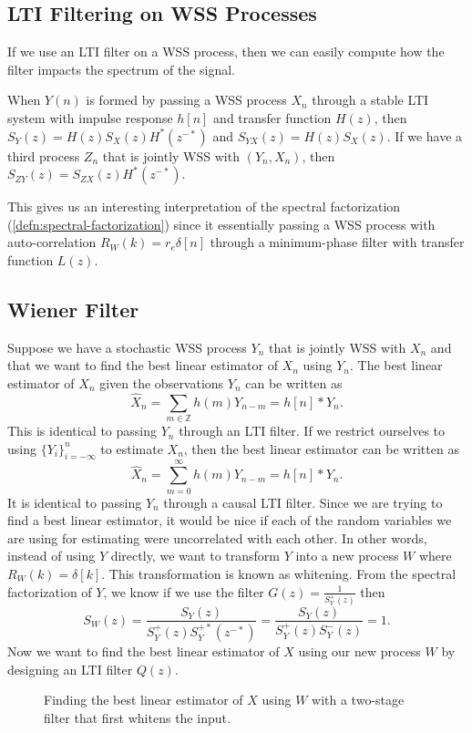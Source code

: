 \subsection{LTI Filtering on WSS Processes}
If we use an LTI filter on a WSS process, then we can easily compute how the filter impacts the spectrum of the signal.
\begin{theorem}
	When $Y(n)$ is formed by passing a WSS process $X_n$ through a stable LTI system with impulse response $h[n]$ and transfer function $H(z)$, then $S_Y(z) = H(z)S_X(z)H^*(z^{-*})$ and $S_{YX}(z) = H(z)S_X(z)$.
	If we have a third process $Z_n$ that is jointly WSS with $(Y_n, X_n)$, then $S_{ZY}(z) = S_{ZX}(z)H^*(z^{-*})$.
	\label{thm:lti-process}
\end{theorem}
This gives us an interesting interpretation of the spectral factorization (\cref{defn:spectral-factorization}) since it essentially passing a WSS process with auto-correlation $R_W(k) = r_e\delta[n]$ through a minimum-phase filter with transfer function $L(z)$.
\subsection{Wiener Filter}
Suppose we have a stochastic WSS process $Y_n$ that is jointly WSS with $X_n$ and that we want to find the best linear estimator of $X_n$ using $Y_n$.
The best linear estimator of $X_n$ given the observations $Y_n$ can be written as \[
	\hat{X}_n = \sum_{m\in\mathbb{Z}}h(m)Y_{n-m} = h[n] * Y_n.
\]
This is identical to passing $Y_n$ through an LTI filter.
If we restrict ourselves to using $\{Y_i\}_{i=-\infty}^{n}$ to estimate $X_n$, then the best linear estimator can be written as \[
	\hat{X}_n = \sum_{m=0}^\infty h(m)Y_{n-m} = h[n] * Y_n.
\]
It is identical to passing $Y_n$ through a causal LTI filter.
Since we are trying to find a best linear estimator, it would be nice if each of the random variables we are using for estimating were uncorrelated with each other.
In other words, instead of using $Y$ directly, we want to transform $Y$ into a new process $W$ where $R_W(k) = \delta[k]$.
This transformation is known as whitening.
From the spectral factorization of $Y$, we know if we use the filter $G(z) =\frac{1}{S_Y^+(z)}$ then \[
	S_W(z) = \frac{S_Y(z)}{S_Y^+(z)S_Y^{+*}(z^{-*})} = \frac{S_Y(z)}{S_Y^+(z)S_Y^-(z)} = 1.
\]
Now we want to find the best linear estimator of $X$ using our new process $W$ by designing an LTI filter $Q(z)$.
\begin{gitbook-image}
\begin{figure}[!h]
  \centering
	\caption{Finding the best linear estimator of $X$ using $W$ with a two-stage filter that first whitens the input.}
  \label{fig:wiener-filter}
\end{figure}
\end{gitbook-image}

